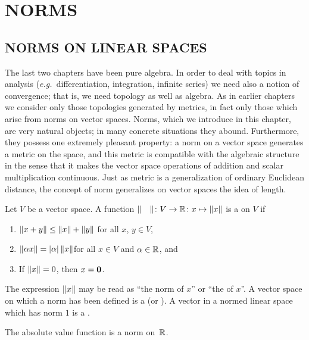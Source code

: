 \chapter{NORMS}\label{nls}
\section{NORMS ON LINEAR SPACES}  The last two chapters have been pure algebra.  In order to deal
with topics in analysis (\emph{e.g.\ }differentiation, integration, infinite series) we need
also a notion of convergence; that is, we need topology as well as algebra. As in earlier
chapters we consider only those topologies generated by metrics, in fact only those which
arise from norms on vector spaces. Norms, which we introduce in this chapter, are very natural
objects; in many concrete situations they abound.  Furthermore, they possess one extremely
pleasant property: a norm on a vector space generates a metric on the space, and this metric
is compatible with the algebraic structure in the sense that it makes the vector space
operations of addition and scalar multiplication continuous.  Just as metric is a
generalization of ordinary Euclidean distance, the concept of norm generalizes on vector
spaces the idea of length.

\begin{defn}  Let $V$ be a vector space. A function
$\lVert\quad\rVert\colon V \rightarrow \mathbb{R}\colon x \mapsto \lVert x\rVert$ is a
 on $V$ if
 \begin{enumerate}
  \item $\lVert x + y\rVert \le \lVert x\rVert + \lVert y\rVert$ \qquad  for all $x$, $y \in V$,
  \item $\lVert\alpha x\rVert = \lvert\alpha\rvert\,\lVert x\rVert$\qquad for all $x \in V$ and $\alpha \in \mathbb{R}$, and
  \item If $\lVert x\rVert = 0$, then $x = \mathbf{0}$.
 \end{enumerate}
The expression $\lVert x\rVert$ may be read as ``the norm of $x$'' or ``the
 of $x$''.  A vector space on which a norm has been defined is a
 (or ). A vector in a normed linear space
which has norm $1$ is a
.
\end{defn}

\begin{exam}  The absolute value function is a norm on~$\mathbb{R}$.
\end{exam}

